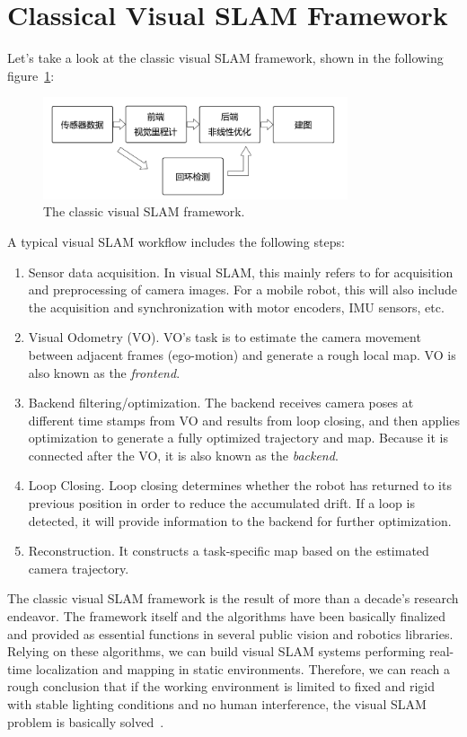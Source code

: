 \section{Classical Visual SLAM Framework}

Let's take a look at the classic visual SLAM framework, shown in the following figure~\ref{fig:workflow}:

\begin{figure}
    \centering
    \includegraphics[width=0.8\textwidth]{./resources/whatIsSLAM/workflow.pdf}
    \caption{The classic visual SLAM framework.}
    \label{fig:workflow}
\end{figure}

A typical visual SLAM workflow  includes the following steps:
\begin{enumerate}
\item{Sensor data acquisition}. In visual SLAM, this mainly refers to for acquisition and preprocessing of camera images. For a mobile robot, this will also include the acquisition and synchronization with motor encoders, IMU sensors, etc.
\item{Visual Odometry (VO)}. VO's task is to estimate the camera movement between adjacent frames (ego-motion) and generate a rough local map. VO is also known as the \emph{frontend}.
\item{Backend filtering/optimization}. The backend receives camera poses at different time stamps from VO and results from loop closing, and then applies optimization to generate a fully optimized trajectory and map. Because it is connected after the VO, it is also known as the \textit{backend}.
\item {Loop Closing}. Loop closing determines whether the robot has returned to its previous position in order to reduce the accumulated drift. If a loop is detected, it will provide information to the backend for further optimization.
\item {Reconstruction}. It constructs a task-specific map based on the estimated camera trajectory.
\end{enumerate}

The classic visual SLAM framework is the result of more than a decade's research endeavor. The framework itself and the algorithms have been basically finalized and provided as essential functions in several public vision and robotics libraries. Relying on these algorithms, we can build visual SLAM systems performing real-time localization and mapping in static environments. Therefore, we can reach a rough conclusion that if the working environment is limited to fixed and rigid with stable lighting conditions and no human interference, the visual SLAM problem is basically solved~\cite{Cadena2016}.

